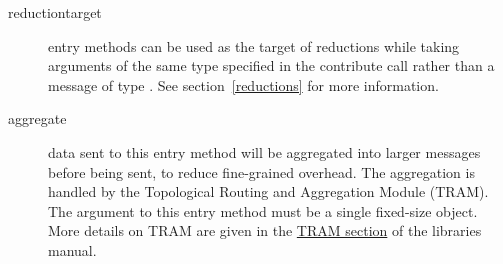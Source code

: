 \begin{description}
\item[reductiontarget] entry methods can be
used as the target of reductions while taking arguments of the same
type specified in the contribute call rather than a message of type
. See section~\ref{reductions} for more
information.

\item[aggregate] data sent to this entry method will be
aggregated into larger messages before being sent, to reduce fine-grained
overhead. The aggregation is handled by the Topological Routing and Aggregation
Module (TRAM). The argument to this entry method must be a single fixed-size
object. More details on TRAM are given in the
\href{http://charm.cs.illinois.edu/manuals/html/libraries/manual-1p.html#TRAM}
{TRAM section} of the libraries manual.

\end{description}
